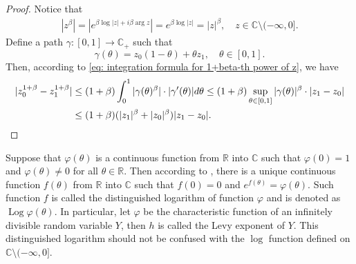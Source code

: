\documentclass[12pt]{amsart}
\theoremstyle{plain}
\theoremstyle{definition}
\numberwithin{equation}{section}
\begin{document}
\begin{proof}
    Notice that
\begin{align}
\label{eq: upper bound for beta power of z}
	|z^\beta| 
	= |e^{\beta \log |z| +i\beta \operatorname {arg}z}| = e^{\beta \log |z|} = |z|^\beta,
	\quad z \in \mathbb C\setminus (-\infty, 0].
\end{align}
    Define a path $\gamma: [0,1] \to \mathbb C_+$ such that
\[
    \gamma(\theta)
    = z_0 (1-\theta) + \theta z_1,
    \quad \theta \in [0,1].
\]
    Then, according to \eqref{eq: integration formula for 1+beta-th power of z}, we have
\begin{align}
    |z_0^{1+\beta} - z_1^{1+\beta}|
    &\leq (1+\beta) \int_0^1 |\gamma(\theta)^{\beta}|\cdot |\gamma'(\theta)|d\theta
    \leq (1+\beta)  \sup_{\theta \in [0,1]} |\gamma(\theta)|^{\beta} \cdot |z_1-z_0|
    \\&\leq (1+\beta)  ( |z_1|^{\beta}+|z_0|^{\beta} ) |z_1-z_0|.
    \qedhere
\end{align}
\end{proof}

	Suppose that $\varphi(\theta)$ is a continuous function from $\mathbb R$ into $\mathbb C$ such that $\varphi(0) = 1$ and $\varphi(\theta) \neq 0$ for all $\theta \in \mathbb R$. 
	Then according to \cite[Lemma 7.6]{Sato1999Levy}, there is a unique continuous function $f(\theta)$ from $\mathbb R$ into $\mathbb C$ such that $f(0) = 0$ and $e^{f(\theta)} = \varphi(\theta)$. 
	Such function $f$ is called the distinguished logarithm of function $\varphi$ and is denoted as $\operatorname{Log} \varphi(\theta)$.
	In particular, let $\varphi$ be the characteristic function of an infinitely divisible random variable $Y$, then $h$ is called the Levy exponent of $Y$. 
	This distinguished logarithm should not be confused with the $\log$ function defined on $\mathbb C\setminus (-\infty, 0]$.
\end{document}

